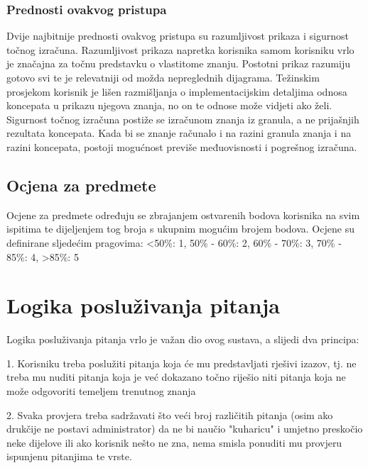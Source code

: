 \documentclass[times, utf8, zavrsni, numeric]{fer}
\begin{document}
\subsubsection{Prednosti ovakvog pristupa}
Dvije najbitnije prednosti ovakvog pristupa su razumljivost prikaza i sigurnost točnog izračuna. Razumljivost prikaza napretka korisnika samom korisniku vrlo je značajna za točnu predstavku o vlastitome znanju. Postotni prikaz razumiju gotovo svi te je relevatniji od možda nepreglednih dijagrama. Težinskim prosjekom korisnik je lišen razmišljanja o implementacijskim detaljima odnosa koncepata u prikazu njegova znanja, no on te odnose može vidjeti ako želi.
Sigurnost točnog izračuna postiže se izračunom znanja iz granula, a ne prijašnjih rezultata koncepata. Kada bi se znanje računalo i na razini granula znanja i na razini koncepata, postoji mogućnost previše međuovisnosti i pogrešnog izračuna.

\subsection{Ocjena za predmete}
Ocjene za predmete određuju se zbrajanjem ostvarenih bodova korisnika na svim ispitima te dijeljenjem tog broja s ukupnim mogućim brojem bodova.
Ocjene su definirane sljedećim pragovima:
\newline
<50\%: 1, 
50\% - 60\%: 2, 
60\% - 70\%: 3, 
70\% - 85\%: 4, 
>85\%: 5

\section{Logika posluživanja pitanja}
Logika posluživanja pitanja vrlo je važan dio ovog sustava, a slijedi dva principa:
\par
1. Korisniku treba poslužiti pitanja koja će mu predstavljati rješivi izazov, tj. ne treba mu nuditi pitanja koja je već dokazano točno riješio niti pitanja koja ne može odgovoriti temeljem trenutnog znanja
\par
2. Svaka provjera treba sadržavati što veći broj različitih pitanja (osim ako drukčije ne postavi administrator) da ne bi naučio "kuharicu" i umjetno preskočio neke dijelove ili ako korisnik nešto ne zna, nema smisla ponuditi mu provjeru ispunjenu pitanjima te vrste.
\end{document}

